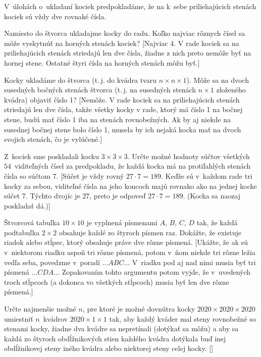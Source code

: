 {

{\everypar{}
\smallskip
V~úlohách o~ukladaní kociek predpokladáme, že
na k~sebe priliehajúcich stenách kociek sú vždy dve rovnaké čísla.
\smallskip
}

Namiesto do štvorca ukladajme kocky do radu. Koľko najviac rôznych čísel sa môže vyskytnúť na horných stenách kociek?
 [Najviac 4. V rade kociek sa na priliehajúcich stenách striedajú len dve čísla, žiadne z nich preto nemôže byť na hornej stene. Ostatné štyri čísla na horných stenách môžu byť.]

Kocky ukladáme do štvorca (t.\,j. do kvádra tvaru $n\times n\times 1$). Môže sa na dvoch susedných bočných stenách štvorca (t.\,j. na susedných stenách $n\times 1$ zloženého kvádra) objaviť číslo 1?
 [Nemôže. V rade kociek sa na priliehajúcich stenách striedajú len dve čísla, takže všetky kocky v rade, ktorý má číslo 1 na bočnej stene, budú mať číslo 1 iba na stenách rovnobežných. Ak by aj niekde na susednej bočnej stene bolo číslo 1, musela by ich nejaká kocka mať na dvoch svojich stenách, čo je vylúčené.]

\D
Z~kociek sme poskladali kocku $3\times3\times3$. Určte možné hodnoty súčtov všetkých $54$~viditeľných čísel za predpokladu, že každá kocka má na protiľahlých stenách čísla so súčtom 7.
 [Súčet je vždy rovný $27\cdot 7=189$. Keďže sú v~každom rade tri kocky za sebou, viditeľné čísla na jeho koncoch majú rovnako ako na jednej kocke súčet 7. Týchto dvojíc je 27, preto je odpoveď $27\cdot 7=189$. (Kocka sa naozaj poskladať dá.)]


Štvorcová tabuľka $10\times 10$ je vyplnená písmenami $A$, $B$, $C$, $D$ tak, že každá podtabuľka $2\times 2$ obsahuje každé zo štyroch písmen raz. Dokážte, že existuje riadok alebo stĺpec, ktorý obsahuje práve dve rôzne písmená.
 [Ukážte, že ak sú v~niektorom riadku aspoň tri rôzne písmená, potom v~ňom niekde tri rôzne ležia vedľa seba, povedzme v~poradí $\dots ABC\dots $ V~riadku pod aj nad nimi musia byť tri písmená $\dots CDA\dots$ Zopakovaním tohto argumentu potom vyjde, že v~uvedených troch stĺpcoch (a dokonca vo všetkých stĺpcoch) musia byť len dve rôzne písmená.]

Určte najmenšie možné $n$, pre ktoré je možné dovnútra kocky $2020\times 2020\times 2020$ umiestniť $n$~kvádrov $2020\times 1\times 1$ tak, aby každý kváder mal steny rovnobežné so stenami kocky, žiadne dva kvádre sa nepretínali (dotýkať sa môžu) a aby sa každá zo štyroch obdĺžnikových stien každého kvádra dotýkala buď inej obdĺžnikovej steny iného kvádra alebo niektorej steny celej kocky.
    []

}

